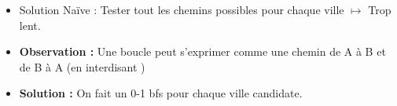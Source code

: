\begin{frame}
    \frametitle{\problemtitle}
    \begin{itemize}
        \begin{block}{Problème}
            Un graphe avec $n$ villes et $m$ villes candidates, trouver la ville candidate dont le cycle est le plus petit.
        \end{block}
        \item<+-> Solution Naïve : Tester tout les chemins possibles pour chaque ville $\mapsto$ Trop lent.
        \item<+-> \textbf{Observation :} Une boucle peut s'exprimer comme une chemin de A à B et de B à A (en interdisant )
        \item<+-> \textbf{Solution :} On fait un 0-1 bfs pour chaque ville candidate.
    \end{itemize}
    \solvestats
\end{frame}
